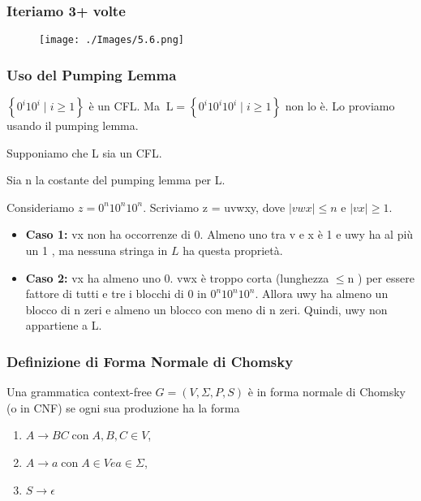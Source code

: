 \subsubsection{Iteriamo 3+ volte}

\begin{figure}[hbpt!]
    \centering
    \texttt{[image: ./Images/5.6.png]}
\end{figure}
\FloatBarrier

\subsubsection{Uso del Pumping Lemma}

$\left\{0^{i} 10^{i} \mid i \geq 1\right\}$ è un CFL.
Ma $\mathrm{~L}=\left\{0^{i} 10^{i} 10^{i} \mid i \geq 1\right\}$ non lo è. Lo proviamo usando il pumping lemma.

Supponiamo che L sia un CFL.

Sia n la costante del pumping lemma per L.

Consideriamo $z=0^{n} 10^{n} 10^{n} .$
Scriviamo z = uvwxy, dove
$|v w x| \leq n$ e $|v x| \geq 1 .$
\begin{itemize}
    \item \textbf{Caso 1:} vx non ha occorrenze di $0 .$
Almeno uno tra v e x è 1 e uwy ha al più un 1 , ma nessuna stringa in $L$ ha questa proprietà.
    \item \textbf{Caso 2:} vx ha almeno uno $0 .$ vwx è troppo corta (lunghezza $\leq \mathrm{n}$ ) per
essere fattore di tutti e tre i blocchi di 0 in
$0^{n} 10^{n} 10^{n} .$ Allora uwy ha almeno un blocco di n zeri e
almeno un blocco con meno di n zeri. Quindi, uwy non appartiene a L.
\end{itemize}

\subsubsection{Definizione di Forma Normale di Chomsky}

Una grammatica context-free $G=(V, \Sigma, P, S)$ è in forma normale di Chomsky (o in CNF) se ogni sua produzione ha la forma
\begin{enumerate}
    \item $A \rightarrow B C \operatorname{con} A, B, C \in V$,
    \item $A \rightarrow a \operatorname{con} A \in V e a \in \Sigma$,
    \item $S \rightarrow \epsilon$
\end{enumerate}

